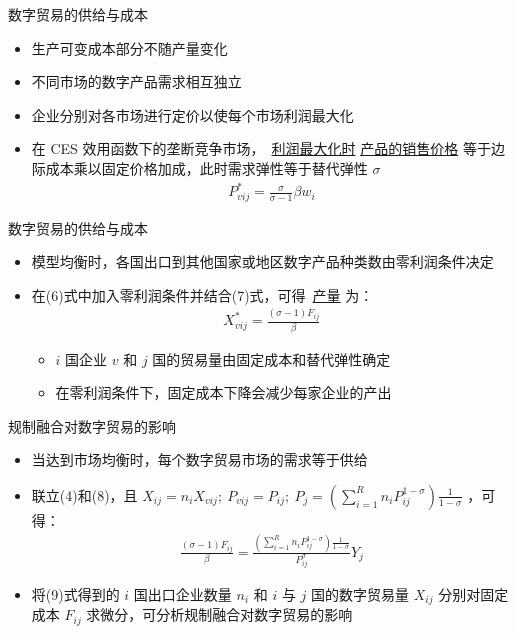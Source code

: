 \documentclass{beamer}
\begin{document}
\begin{frame}{数字贸易的供给与成本}
    \begin{itemize}
        \item 生产可变成本部分不随产量变化
        \item 不同市场的数字产品需求相互独立
        \item 企业分别对各市场进行定价以使每个市场利润最大化
        \item 在 CES 效用函数下的垄断竞争市场，\ \underline{利润最大化时} \underline{产品的销售价格} 等于边际成本乘以固定价格加成，此时需求弹性等于替代弹性 $\sigma$
        \begin{align}
            P_{vij}^{*} = \frac{\sigma}{\sigma - 1} \beta w_i \tag{7}
        \end{align}
    \end{itemize}
\end{frame}

\begin{frame}{数字贸易的供给与成本}
    \begin{itemize}
        \item 模型均衡时，各国出口到其他国家或地区数字产品种类数由零利润条件决定
        \item 在(6)式中加入零利润条件并结合(7)式，可得\ \underline{产量} 为：
        \begin{align}
            X_{vij}^{*} = \frac{(\sigma - 1) F_{ij}}{\beta} \tag{8}
        \end{align}
        \begin{itemize}
            \item $i$ 国企业 $v$ 和 $j$ 国的贸易量由固定成本和替代弹性确定
            \item 在零利润条件下，固定成本下降会减少每家企业的产出
        \end{itemize}
    \end{itemize}
\end{frame}

\begin{frame}{规制融合对数字贸易的影响}
    \begin{itemize}
        \item 当达到市场均衡时，每个数字贸易市场的需求等于供给
        \item 联立(4)和(8)，且 $X_{ij}=n_i X_{vij};\ P_{vij}=P_{ij};\ P_{j}=(\sum_{i=1}^R n_iP_{ij}^{1-\sigma}){\frac{1}{1-\sigma}}$ ，可得：
        \begin{align}
            \frac{(\sigma - 1)F_{ij}}{\beta} = \frac{(\sum_{i=1}^R n_iP_{ij}^{1-\sigma}){\frac{1}{1-\sigma}}}{P_{ij}^{\sigma}} Y_j \tag{9}
        \end{align}
        \item 将(9)式得到的 $i$ 国出口企业数量 $n_i$ 和 $i$ 与 $j$ 国的数字贸易量 $X_{ij}$ 分别对固定成本 $F_{ij}$ 求微分，可分析规制融合对数字贸易的影响
    \end{itemize}
\end{frame}
\end{document}
